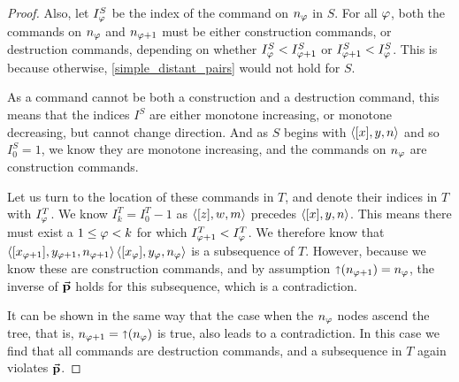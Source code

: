 \begin{proof}
Also, let $I^S_\varphi$ be the index of the command on $n_\varphi$ in $S$.
For all $\varphi$, both the commands on $n_\varphi$ and $n_{\varphi+1}$ must be either
construction commands, or destruction commands, depending on
whether $I^S_\varphi<I^S_{\varphi+1}$ or $I^S_{\varphi+1}<I^S_\varphi$.
This is because otherwise, \cref{simple_distant_pairs} would not hold for $S$.

As a command cannot be both a construction and a destruction command,
this means that the indices $I^S$ are either monotone increasing, or monotone
decreasing, but cannot change direction.
And as $S$ begins with $\langle{[x],y,n}\rangle$ and so $I^S_0=1$, we know they are monotone increasing,
and the commands on $n_\varphi$ are construction commands.

Let us turn to the location of these commands in $T$,
and denote their indices in $T$ with $I^T_\varphi$.
We know $I^T_k=I^T_0-1$ as $\langle{[z],w,m}\rangle$ precedes $\langle{[x],y,n}\rangle$.
This means there must exist a $1\leq \varphi<k$ for which $I^T_{\varphi+1}<I^T_\varphi$.
We therefore know that
$\langle{[x_{\varphi+1}],y_{\varphi+1},n_{\varphi+1}}\rangle \, \langle{[x_\varphi],y_\varphi,n_\varphi}\rangle$
is a subsequence of $T$.
However, because we know these are construction commands, and by assumption $\mathord{\shortuparrow}({n_{\varphi+1}})=n_\varphi$,
the inverse of $\mathrel{\vec{\mathbf{p}}}$ holds for this subsequence, which is a contradiction.


It can be shown in the same way
that the case when the $n_\varphi$ nodes ascend the tree,
that is, $n_{\varphi+1}=\mathord{\shortuparrow}({n_\varphi})$ is true, also leads to a contradiction.
In this case we find that all commands are destruction commands,
and a subsequence in $T$ again violates $\mathrel{\vec{\mathbf{p}}}$.
\end{proof}


